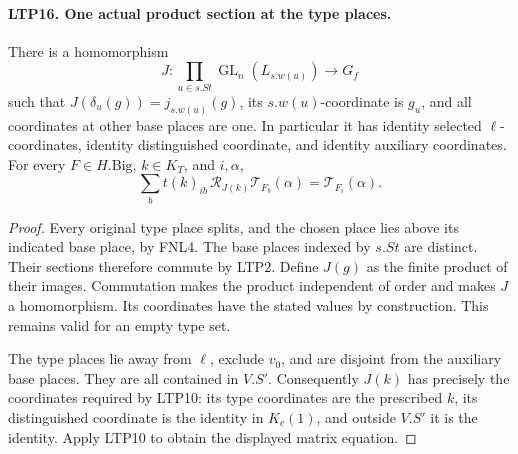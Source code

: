 \documentclass[11pt,a4paper]{article}
\numberwithin{equation}{section}
\theoremstyle{remark}\newtheorem{remark}[theorem]{Remark}
\begin{document}
\paragraph{LTP16. One actual product section at the type places.}
\label{claim:LTP16}
There is a homomorphism
\[
       J:\prod_{u\in s.St}\operatorname{GL}_n(L_{s.w(u)})
                                      \longrightarrow G_f
\]
such that \(J(\delta_u(g))=j_{s.w(u)}(g)\), its \(s.w(u)\)-coordinate
is \(g_u\), and all coordinates at other base places are one.
In particular it has identity selected \(\ell\)-coordinates,
identity distinguished coordinate, and identity auxiliary coordinates.
For every \(F\in H.\mathrm{Big}\), \(k\in K_T\), and \(i,\alpha\),
\[
       \sum_b t(k)_{ib}\,
               \mathscr R_{J(k)}\mathcal T_{F_b}(\alpha)
                          =\mathcal T_{F_i}(\alpha).
\]
\begin{proof}
Every original type place splits, and the chosen place lies above
its indicated base place, by FNL4.  The base places indexed by
\(s.St\) are distinct.  Their sections therefore commute by LTP2.
Define \(J(g)\) as the finite product of their images.
Commutation makes the product independent of order and makes
\(J\) a homomorphism.  Its coordinates have the stated values
by construction.  This remains valid for an empty type set.

The type places lie away from \(\ell\), exclude \(v_0\), and are
disjoint from the auxiliary base places.  They are all contained
in \(V.S'\).  Consequently \(J(k)\) has precisely the coordinates
required by LTP10: its type coordinates are the prescribed \(k\),
its distinguished coordinate is the identity in \(K_c(1)\), and
outside \(V.S'\) it is the identity.  Apply LTP10 to obtain the
displayed matrix equation.
\end{proof}

\end{document}
